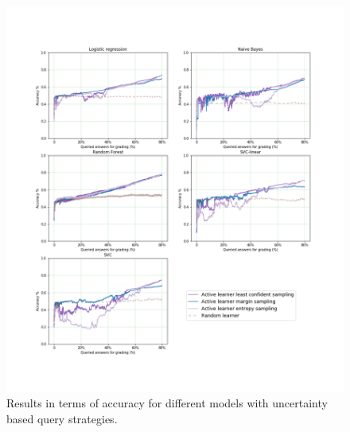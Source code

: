 \begin{figure}[!htb]
	\centering
	\includegraphics[scale=0.45]{images/task7_accuracy_uncertainty}
	\caption{Results in terms of accuracy for different models with uncertainty based query strategies.}
	\label{t7_m_uncertainty}
\end{figure}

